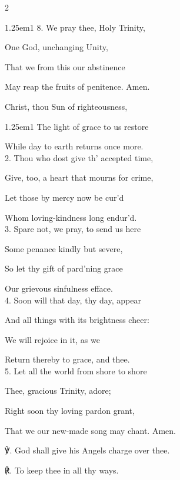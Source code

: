 \begin{paracol}{2}
\begin{hangparas}{1.25em}{1}
8. We pray thee, Holy Trinity,

One God, unchanging Unity,

That we from this our abstinence

May reap the fruits of penitence. Amen.
\end{hangparas}

\switchcolumn

\mattinsOfficeHymn\label{FirstLentMattinsHymn}

 Christ, thou Sun of righteousness,

\begin{hangparas}{1.25em}{1}
The light of grace to us restore

While day to earth returns once more.\\

2. Thou who dost give th' accepted time,

Give, too, a heart that mourns for crime,

Let those by mercy now be cur'd

Whom loving-kindness long endur'd.\\

3. Spare not, we pray, to send us here

Some penance kindly but severe,

So let thy gift of pard'ning grace

Our grievous sinfulness efface.\\

4. Soon will that day, thy day, appear

And all things with its brightness cheer:

We will rejoice in it, as we

Return thereby to grace, and thee.\\

5. Let all the world from shore to shore

Thee, gracious Trinity, adore;

Right soon thy loving pardon grant,

That we our new-made song may chant. Amen.\\
\end{hangparas}

℣. God shall give his Angels charge over thee.

℟. To keep thee in all thy ways.

\end{paracol}

